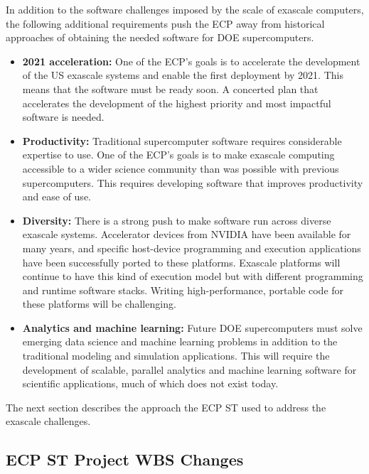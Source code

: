 In addition to the software challenges imposed by the scale of exascale computers, the following additional requirements push the ECP away from historical approaches of obtaining the needed software for DOE supercomputers.
\begin{itemize}
\item \textbf{2021 acceleration:} One of the ECP's goals is to accelerate the development of the US exascale systems and enable the first deployment by 2021. This means that the software must be ready soon. A concerted plan that accelerates the development of the highest priority and most impactful software is needed.
\item \textbf{Productivity:} Traditional supercomputer software requires considerable expertise to use. One of the ECP's goals is to make exascale computing accessible to a wider science community than was possible with previous supercomputers. This requires developing software that improves productivity and ease of use.
\item \textbf{Diversity:} There is a strong push to make software run across diverse exascale systems. Accelerator devices from NVIDIA have been available for many years, and specific host-device programming and execution applications have been successfully ported to these platforms.  Exascale platforms will continue to have this kind of execution model but with different programming and runtime software stacks.  Writing high-performance, portable code for these platforms will be challenging.
\item \textbf{Analytics and machine learning:} Future DOE supercomputers must solve emerging data science and machine learning problems in addition to the traditional modeling and simulation applications. This will require the development of scalable, parallel analytics and machine learning software for scientific applications, much of which does not exist today.
\end{itemize}
 
\noindent The next section describes the approach the ECP ST used to address the exascale challenges.

\subsection{ECP ST Project WBS Changes}\label{subsect:ProjectRestructuring}

